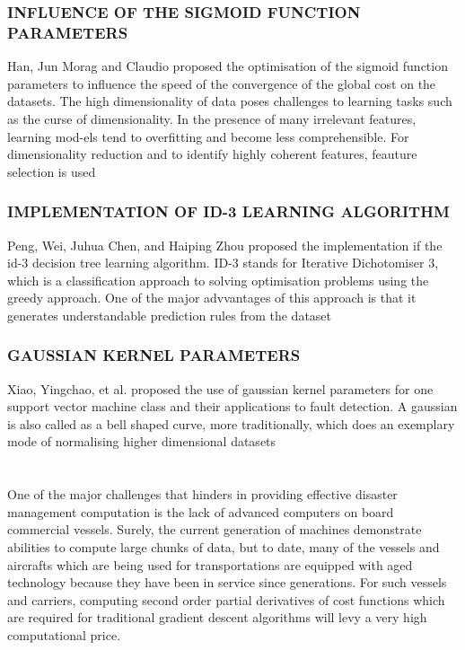 \documentclass[12pt]{article}
\newcommand{\secsize}{\fontsize{15pt}{12pt}\selectfont}
\begin{document}
\subsubsection{\textbf{INFLUENCE OF THE SIGMOID FUNCTION PARAMETERS}}
Han, Jun Morag and Claudio proposed the optimisation of the sigmoid function parameters to influence the speed of the convergence of the global cost on the datasets. The high dimensionality of data poses challenges to learning tasks such as the curse of dimensionality. In the presence of many irrelevant features, learning mod-els tend to overfitting and become less comprehensible. For dimensionality reduction and to identify highly coherent features, feauture selection is used 

\subsubsection{\textbf{IMPLEMENTATION OF ID-3 LEARNING ALGORITHM}}
Peng, Wei,  Juhua Chen, and Haiping Zhou proposed the implementation if the id-3 decision tree learning algorithm. ID-3 stands for Iterative Dichotomiser 3, which is a classification approach to solving optimisation problems using the greedy approach. One of the major advvantages of this approach is that it generates understandable prediction rules from the dataset

\subsubsection{\textbf{GAUSSIAN KERNEL PARAMETERS}}
Xiao, Yingchao, et al. proposed the use of gaussian kernel parameters for one support vector machine class and their applications to fault detection. A gaussian is also called as a bell shaped curve, more traditionally, which does an exemplary mode of normalising higher dimensional datasets

\newpage 

\section{\textbf{\secsize{PROBLEM IDENTIFICATION}}}
One of the major challenges that hinders in providing effective disaster management computation is the lack of advanced computers on board commercial vessels. Surely, the current generation of machines demonstrate abilities to compute large chunks of data, but to date, many of the vessels and aircrafts which are being used for transportations are equipped with aged technology because they have been in service since generations. For such vessels and carriers, computing second order partial derivatives of cost functions which are required for traditional gradient descent algorithms will levy a very high computational price. 
\end{document}
